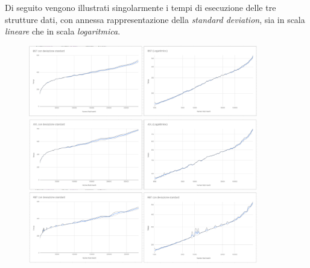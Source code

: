 \documentclass[a4paper]{article}
\begin{document}
		\newpage
		Di seguito vengono illustrati singolarmente i tempi di esecuzione delle tre strutture dati, con annessa rappresentazione della \textit{standard deviation}, sia in scala \textit{lineare} che in scala \textit{logaritmica}.\\
		\begin{figure}[ht]
			\includegraphics[width=10cm]{BST}
			\includegraphics[width=10cm]{AVL}
			\includegraphics[width=10cm]{RBT}
		\end{figure}
		
		
		\newpage
\end{document}
